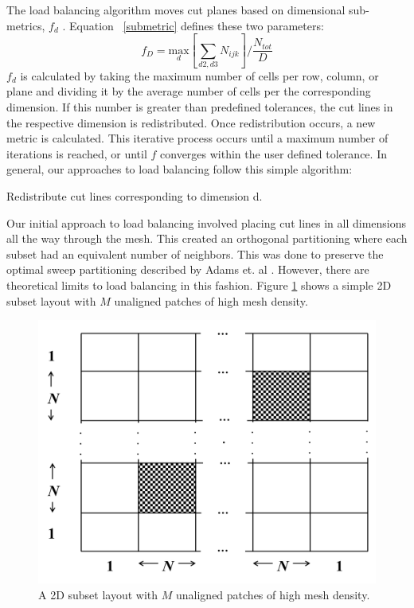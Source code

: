 \documentclass[letterpaper]{mandc2019}
\begin{document}
The load balancing algorithm moves cut planes based on dimensional sub-metrics, $f_d$ . Equation ~\eqref{submetric} defines these two parameters:
\begin{equation}
f_{D} = \underset{d}{\text{max}}[\sum_{d2,d3} N_{ijk}]/\frac{N_{tot}}{D}
\label{submetric}
\end{equation}
$f_{d}$ is calculated by taking the maximum number of cells per row, column, or plane and dividing it by the average number of cells per the corresponding dimension. If this number is greater than predefined tolerances, the cut lines in the respective dimension is redistributed. Once redistribution occurs, a new metric is calculated. This iterative process occurs until a maximum number of iterations is reached, or until $f$ converges within the user defined tolerance. In general, our approaches to load balancing follow this simple algorithm:

\begin{algorithm}
\begin{algorithmic}

		\STATE Redistribute cut lines corresponding to dimension d.
	\ENDIF	
\ENDFOR
\ENDWHILE
\end{algorithmic}
\end{algorithm}

Our initial approach to load balancing involved placing cut lines in all dimensions all the way through the mesh. This created an orthogonal partitioning where each subset had an equivalent number of neighbors. This was done to preserve the optimal sweep partitioning described by Adams et. al \cite{mpadams2015}. However, there are theoretical limits to load balancing in this fashion. Figure \ref{2dgeneral} shows a simple 2D subset layout with $M$ unaligned patches of high mesh density.

\begin{figure}[H]
\centering
\includegraphics[scale=0.6]{figures/2dgeneral.png}
\caption{A 2D subset layout with $M$ unaligned patches of high mesh density.}
\label{2dgeneral}
\end{figure}
\end{document}
